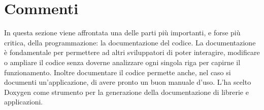 %

\section{Commenti}\label{sec:comments}

In questa sezione viene affrontata una delle parti più importanti, e forse più critica, della programmazione: la documentazione del codice.
La documentazione è fondamentale per permettere ad altri sviluppatori di poter interagire, modificare o ampliare il codice senza doverne analizzare ogni singola riga per capirne il funzionamento. 
Inoltre documentare il codice permette anche, nel caso si documenti un'applicazione, di avere pronto un buon manuale d'uso.
L'\sigla ha scelto Doxygen\cite{codestyle:doxygen} come strumento per la generazione della documentazione di librerie e applicazioni.

